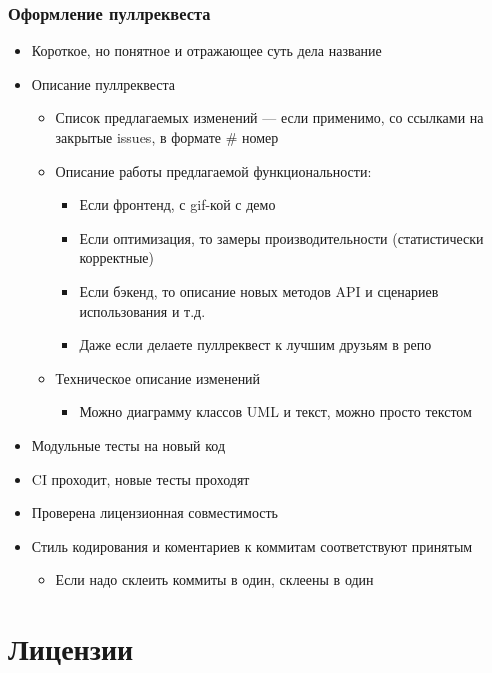 \documentclass{../../slides-style}
\begin{document}
    \begin{frame}
        \frametitle{Оформление пуллреквеста}
        \begin{itemize}
            \item Короткое, но понятное и отражающее суть дела название
            \item Описание пуллреквеста
            \begin{itemize}
                \item Список предлагаемых изменений --- если применимо, со ссылками на закрытые issues, в формате \# номер
                \item Описание работы предлагаемой функциональности:
                \begin{itemize}
                    \item Если фронтенд, с gif-кой с демо
                    \item Если оптимизация, то замеры производительности (статистически корректные)
                    \item Если бэкенд, то описание новых методов API и сценариев использования и т.д.
                    \item Даже если делаете пуллреквест к лучшим друзьям в репо
                \end{itemize}
                \item Техническое описание изменений
                \begin{itemize}
                    \item Можно диаграмму классов UML и текст, можно просто текстом
                \end{itemize}
            \end{itemize}
            \item Модульные тесты на новый код
            \item CI проходит, новые тесты проходят
            \item Проверена лицензионная совместимость
            \item Стиль кодирования и коментариев к коммитам соответствуют принятым
            \begin{itemize}
                \item Если надо склеить коммиты в один, склеены в один
            \end{itemize}
        \end{itemize}
    \end{frame}

    \section{Лицензии}
\end{document}
